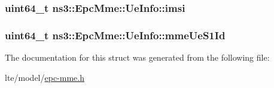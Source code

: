 \subsubsection[{\texorpdfstring{imsi}{imsi}}]{\setlength{\rightskip}{0pt plus 5cm}uint64\+\_\+t ns3\+::\+Epc\+Mme\+::\+Ue\+Info\+::imsi}\hypertarget{structns3_1_1EpcMme_1_1UeInfo_a361611ef13ada4ca3f13c065bfe155d2}{}\label{structns3_1_1EpcMme_1_1UeInfo_a361611ef13ada4ca3f13c065bfe155d2}
\subsubsection[{\texorpdfstring{mme\+Ue\+S1\+Id}{mmeUeS1Id}}]{\setlength{\rightskip}{0pt plus 5cm}uint64\+\_\+t ns3\+::\+Epc\+Mme\+::\+Ue\+Info\+::mme\+Ue\+S1\+Id}\hypertarget{structns3_1_1EpcMme_1_1UeInfo_a04d3d3298a0ef216b7dd5bed9622dc46}{}\label{structns3_1_1EpcMme_1_1UeInfo_a04d3d3298a0ef216b7dd5bed9622dc46}


The documentation for this struct was generated from the following file\+:\begin{DoxyCompactItemize}
\item 
lte/model/\hyperlink{epc-mme_8h}{epc-\/mme.\+h}\end{DoxyCompactItemize}
